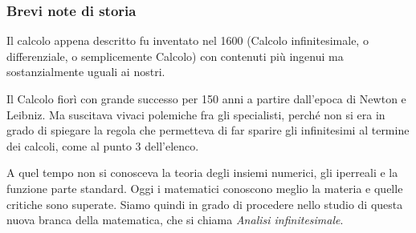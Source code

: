 \subsubsection{Brevi note di storia}
Il calcolo appena descritto fu inventato nel 1600 (Calcolo infinitesimale, o 
differenziale, o semplicemente Calcolo) con contenuti più ingenui ma 
sostanzialmente uguali ai nostri. 

Il Calcolo fiorì con grande successo per 150 anni a partire 
dall'epoca di Newton e Leibniz. 
Ma suscitava vivaci polemiche fra gli specialisti, perché non si era 
in grado di spiegare la regola che permetteva di far sparire gli 
infinitesimi al termine dei calcoli, come al punto 3 dell'elenco.

A quel tempo non si conosceva la teoria degli 
insiemi numerici, gli iperreali e la funzione parte standard.
Oggi i matematici conoscono meglio la materia e quelle critiche  
sono superate. 
Siamo quindi in grado di procedere nello studio di questa nuova branca 
della matematica, che si chiama \emph{Analisi infinitesimale}.



